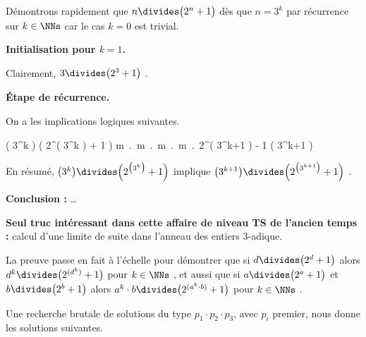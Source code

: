 \documentclass[12pt]{article}
\begin{document}
Démontrons rapidement que $n \divides \big( 2^n + 1 \big)$ dès que $n = 3^k$ par récurrence sur $k \in \NNs$ car le cas $k = 0$ est trivial.

\bigskip

\textbf{Initialisation pour $k = 1$.}

\smallskip

Clairement, $3 \divides \big( 2^3 + 1 \big)$ .

\bigskip

\textbf{Étape de récurrence.}

\smallskip

On a les implications logiques suivantes.

\medskip

\begin{stepcalc}[style=ar*, ope=\implies]
	\big( 3^k \big) \divides \Big( 2^{\big( 3^k \big)} + 1 \Big)
\explnext{}
	\exists m \in \ZZ \,.\, \Big[ 2^{\big( 3^k \big)} + 1 = m \cdot 3^k  \Big]
\explnext{}
	\exists m \in \ZZ \,.\, \Big[ 2^{\big( 3^k \big)} = - 1 + m \cdot 3^k  \Big]
\explnext{}
	\exists m \in \ZZ \,.\, \Big[ \left( 2^{\big( 3^k \big)} \right)^3 = \big( - 1 + m \cdot 3^k \big)^3  \Big]
\explnext{}
	\exists m \in \ZZ \,.\, \Big[ 2^{\big( 3^{k+1} \big)} = - 1 + 3 \cdot m \cdot 3^k - 3 \cdot \big( m \cdot 3^k \big)^2 + \big( m \cdot 3^k \big)^3  \Big]
	2^{\big( 3^{k+1} \big)} \equiv - 1 \mod\!\big( 3^{k+1} \big)
\end{stepcalc}

\smallskip

En résumé, 
$\big( 3^k \big) \divides \Big( 2^{\big( 3^k \big)} + 1 \Big)$ 
implique
$\big( 3^{k+1} \big) \divides \Big( 2^{\big( 3^{k+1} \big)} + 1 \Big)$  .

\bigskip

\textbf{Conclusion :} \dots

\bigskip

\textbf{Seul truc intéressant dans cette affaire de niveau TS de l'ancien temps :} calcul d'une limite de suite dans l'anneau des entiers $3$-adique.


\bigskip

La preuve passe en fait à l'échelle pour démontrer que si 
$d \divides \big( 2^d + 1 \big)$
alors
$d^k \divides \big( 2^{(d^k)} + 1 \big)$ pour $k \in \NNs$ ,
et aussi que si
$a \divides \big( 2^a + 1 \big)$ et $b \divides \big( 2^b + 1 \big)$
alors
$a^k \cdot b \divides \big( 2^{(a^k \cdot b)} + 1 \big)$ pour $k \in \NNs$ .


\bigskip

Une recherche brutale de solutions du type $p_1 \cdot p_2 \cdot p_3$, avec $p_i$ premier, nous donne les solutions suivantes.
\end{document}
